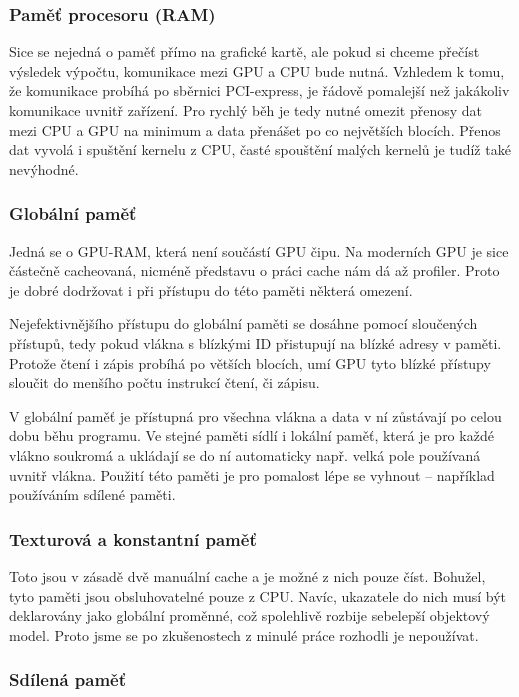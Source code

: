 \subsubsection{Paměť procesoru (RAM)}

Sice se nejedná o paměť přímo na grafické kartě, ale pokud si chceme přečíst výsledek výpočtu, komunikace mezi GPU a CPU bude nutná. Vzhledem k tomu, že komunikace probíhá po sběrnici PCI-express, je řádově pomalejší než jakákoliv komunikace uvnitř zařízení. Pro rychlý běh je tedy nutné omezit přenosy dat mezi CPU a GPU na minimum a data přenášet po co největších blocích. Přenos dat vyvolá i spuštění kernelu z CPU, časté spouštění malých kernelů je tudíž také nevýhodné.

\subsubsection{Globální paměť}

Jedná se o GPU-RAM, která není součástí GPU čipu. Na moderních GPU je sice částečně cacheovaná, nicméně představu o práci cache nám dá až profiler. Proto je dobré dodržovat i při přístupu do této paměti některá omezení.

Nejefektivnějšího přístupu do globální paměti se dosáhne pomocí sloučených přístupů, tedy pokud vlákna s blízkými ID přistupují na blízké adresy v paměti. Protože čtení i zápis probíhá po větších blocích, umí GPU tyto blízké přístupy sloučit do menšího počtu instrukcí čtení, či zápisu.

V globální paměť je přístupná pro všechna vlákna a data v ní zůstávají po celou dobu běhu programu. Ve stejné paměti sídlí i lokální paměť, která je pro každé vlákno soukromá a ukládají se do ní automaticky např. velká pole používaná uvnitř vlákna. Použití této paměti je pro pomalost lépe se vyhnout -- například používáním sdílené paměti.

\subsubsection{Texturová a konstantní paměť}

Toto jsou v zásadě dvě manuální cache a je možné z nich pouze číst. Bohužel, tyto paměti jsou obsluhovatelné pouze z CPU. Navíc, ukazatele do nich musí být deklarovány jako globální proměnné, což spolehlivě rozbije sebelepší objektový model. Proto jsme se po zkušenostech z minulé práce  rozhodli je nepoužívat.

\subsubsection{Sdílená paměť}

